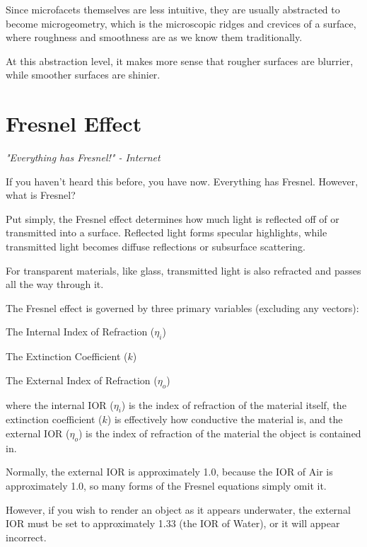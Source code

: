 \documentclass[12pt,letterpaper]{article}
\newenvironment{tight_enumerate}{
\begin{enumerate}
  \setlength{\itemsep}{0pt}
  \setlength{\parskip}{0pt}
}{\end{enumerate}}
\begin{document}
Since microfacets themselves are less intuitive, they are usually abstracted to become microgeometry, 
which is the microscopic ridges and crevices of a surface, where roughness and smoothness are as we know them traditionally.

At this abstraction level, it makes more sense that rougher surfaces are blurrier, while smoother surfaces are shinier.

\newpage

\section{Fresnel Effect}

\textit{"Everything has Fresnel!" - Internet}

If you haven't heard this before, you have now. Everything has Fresnel. However, what is Fresnel?

Put simply, the Fresnel effect determines how much light is reflected off of or transmitted into a surface. 
Reflected light forms specular highlights, while transmitted light becomes diffuse reflections or subsurface scattering.

For transparent materials, like glass, transmitted light is also refracted and passes all the way through it.

The Fresnel effect is governed by three primary variables (excluding any vectors):

\begin{tight_enumerate}
    \item The Internal Index of Refraction ($\eta_i$)
    \item The Extinction Coefficient ($k$)
    \item The External Index of Refraction ($\eta_o$)
\end{tight_enumerate}

where the internal IOR ($\eta_i$) is the index of refraction of the material itself, 
the extinction coefficient ($k$) is effectively how conductive the material is, and the external IOR ($\eta_o$) is the 
index of refraction of the material the object is contained in. 

Normally, the external IOR is approximately 1.0, because the IOR of Air is approximately 1.0, 
so many forms of the Fresnel equations simply omit it.

However, if you wish to render an object as it appears underwater, the external IOR must be set to approximately 1.33 (the IOR of Water), 
or it will appear incorrect.
\end{document}
